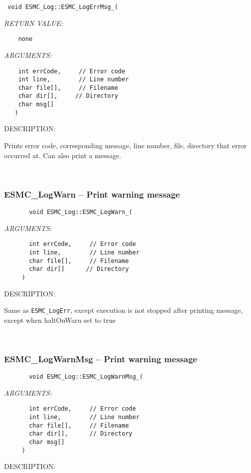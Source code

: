   
\begin{verbatim} 
 void ESMC_Log::ESMC_LogErrMsg_(
 \end{verbatim}{\em RETURN VALUE:}
\begin{verbatim}    none\end{verbatim}{\em ARGUMENTS:}
\begin{verbatim} 
    int errCode,     // Error code
    int line,        // Line number
    char file[],     // Filename
    char dir[],     // Directory
    char msg[]
   )\end{verbatim}
{\sf DESCRIPTION:\\ }


   Prints error code, corresponding message, line number, file, directory
   that error occurred at.  Can also print a message. 
 
\mbox{}\hrulefill\ 
 
\subsubsection [ESMC\_LogWarn] {ESMC\_LogWarn -- Print warning message}


  
\begin{verbatim}       void ESMC_Log::ESMC_LogWarn_(\end{verbatim}{\em ARGUMENTS:}
\begin{verbatim}       int errCode,     // Error code
       int line,        // Line number
       char file[],     // Filename
       char dir[]      // Directory
     )\end{verbatim}
{\sf DESCRIPTION:\\ }


    Same as {\tt ESMC\_LogErr}, except execution is not stopped after
    printing message, except when haltOnWarn set to true
   
 
\mbox{}\hrulefill\ 
 
\subsubsection [ESMC\_LogWarnMsg] {ESMC\_LogWarnMsg -- Print warning message}


  
\begin{verbatim}       void ESMC_Log::ESMC_LogWarnMsg_(\end{verbatim}{\em ARGUMENTS:}
\begin{verbatim}       int errCode,     // Error code
       int line,        // Line number
       char file[],     // Filename
       char dir[],      // Directory
       char msg[]
     )\end{verbatim}
{\sf DESCRIPTION:\\ }


